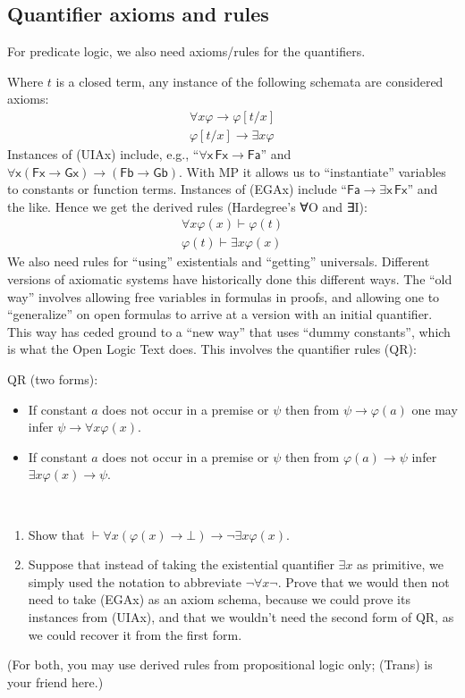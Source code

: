\documentclass[12pt]{report}
\theoremstyle{nonumberplain}
\newcounter{hwex}
\newenvironment{hw}{\refstepcounter{hwex}\bigskip\noindent\fbox{\textsc{~Homework~\arabic{hwex}~}}\\[0.2\baselineskip]
\noindent}{}
\renewcommand{\o}[1]{\mathsf{#1}}
\begin{document}
\subsection*{Quantifier axioms and rules}

For predicate logic, we also need axioms/rules for the quantifiers.

Where $t$ is a closed term, any instance of the following schemata are considered axioms:
\begin{align}
∀x φ → φ[t/x] \tag{UIAx}\\
φ[t/x] → ∃xφ\tag{EGAx}
\end{align}
Instances of (UIAx) include, e.g., ``$∀\o{x\,Fx} → \o{Fa}$'' and $∀\o{x}(\o{Fx} → \o{Gx}) → (\o{Fb} → \o{Gb})$. With MP it allows us to ``instantiate'' variables to constants or function terms. Instances of (EGAx) include ``$\o{Fa} → ∃\o{x\,Fx}$'' and the like. Hence we get the derived rules (Hardegree's ∀O and ∃I):
\begin{align*}
∀xφ(x) ⊢ φ(t) \tag{UI}
\\
φ(t) ⊢ ∃xφ(x) \tag{EG}
\end{align*}
We also need rules for ``using'' existentials and ``getting'' universals. Different versions of axiomatic systems have historically done this different ways. The ``old way'' involves allowing free variables in formulas in proofs, and allowing one to ``generalize'' on open formulas to arrive at a version with an initial quantifier. This way has ceded ground to a ``new way'' that uses ``dummy constants'', which is what the Open Logic Text does. This involves the quantifier rules (QR):

\medskip\noindent QR (two forms):
\begin{itemize}[noitemsep]
\item If constant $a$ does not occur in a premise or $ψ$ then from $ψ → φ(a)$ one may infer $ψ → ∀xφ(x)$.
\item If constant $a$ does not occur in a premise or $ψ$ then from $φ(a) → ψ$ infer $∃xφ(x) → ψ$.
\end{itemize}

\begin{hw}
\begin{enumerate}[noitemsep,label=(\alph*)]
\item Show that $⊢ ∀x(φ(x) → ⊥) → ¬∃xφ(x)$.
\item  Suppose that instead of taking the existential quantifier $∃x$ as primitive, we simply used the notation to abbreviate $¬∀x¬$. Prove that we would then not need to take (EGAx) as an axiom schema, because we could prove its instances from (UIAx), and that we wouldn't need the second form of QR, as we could recover it from the first form.
\end{enumerate}
(For both, you may use derived rules from propositional logic only; (Trans) is your friend here.)
\end{hw}
\end{document}
